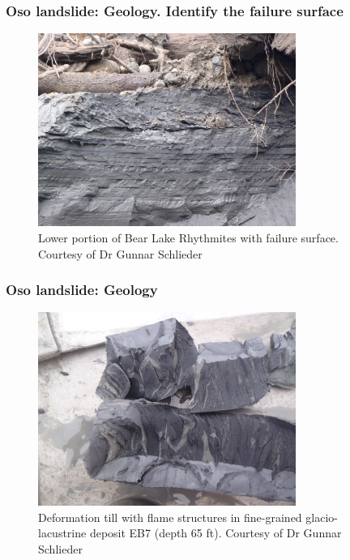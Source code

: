 \documentclass[notes]{beamer}
\begin{document}
\begin{frame}
	\frametitle{Oso landslide: Geology. Identify the failure surface}
	\begin{figure}
		\includegraphics[width=0.75\textwidth]{figs/oso/slip-surface.jpeg}
		\caption*{Lower portion of Bear Lake Rhythmites with failure surface. Courtesy of Dr Gunnar Schlieder}
	\end{figure}
\end{frame}

\begin{frame}
	\frametitle{Oso landslide: Geology}
	\begin{figure}
		\includegraphics[width=0.75\textwidth]{figs/oso/flame-structures.jpg}
		\caption*{Deformation till with flame structures in fine-grained glacio-lacustrine deposit EB7 (depth 65 ft). Courtesy of Dr Gunnar Schlieder}
	\end{figure}
\end{frame}
\end{document}
